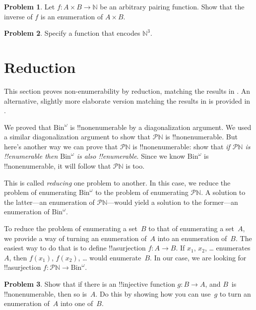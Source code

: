 \documentclass[10pt,a4paper]{article}
\makeatletter
\theoremstyle{plain}
\theoremstyle{definition}
\newtheorem{prob}{Problem}[section]
\theoremstyle{remark}
\newenvironment{editorial}{}{}
\newcommand*{\olfileid}[3]{}
\newcommand*{\olsection}[1]{\section*{#1}}
\newcommand{\olref}{\@ifnextchar[{\olref@i}{\olref@final}}
\def\olref@i[#1]{\@ifnextchar[{\olref@ii}{\olref@final}}
\def\olref@ii[#1]{\@ifnextchar[{\olref@iii}{\olref@final}}
\def\olref@iii[#1]{\olref@final}
\def\olref@final#1{\ref{#1}}
\providecommand{\Nat}{\ensuremath{\mathbb{N}}}
\providecommand{\Bin}{\mathrm{Bin}}
\providecommand{\Pow}{\mathcal{P}}
\makeatother
\begin{document}
\begin{prob}
Let $f \colon A \times B \to \Nat$ be an arbitrary pairing function.
Show that the inverse of $f$ is an enumeration of $A \times B$.
\end{prob}

\begin{prob}
Specify a function that encodes $\Nat^3$.
\end{prob}





\olfileid{sfr}{siz}{red-alt}

\olsection{Reduction}

\begin{editorial}
  This section proves non-enumerability by reduction, matching the
  results in \olref[nen-alt]{sec}. An alternative, slightly more
  elaborate version matching the results in \olref[nen]{sec} is
  provided in \olref[red]{sec}.
\end{editorial}

We proved that $\Bin^\omega$ is !!{nonenumerable} by a diagonalization
argument. We used a similar diagonalization argument to show that
$\Pow{\Nat}$ is !!{nonenumerable}. But here's another way we can prove
that $\Pow{\Nat}$ is !!{nonenumerable}: show that \emph{if
$\Pow{\Nat}$ is !!{enumerable} then $\Bin^\omega$ is also
!!{enumerable}}.  Since we know $\Bin^\omega$ is !!{nonenumerable}, it
will follow that $\Pow{\Nat}$ is too.  

This is called \emph{reducing} one problem to another. In this case,
we reduce the problem of enumerating $\Bin^\omega$ to the problem of
enumerating $\Pow{\Nat}$.  A solution to the latter---an enumeration
of $\Pow{\Nat}$---would yield a solution to the former---an
enumeration of $\Bin^\omega$.

To reduce the problem of enumerating a set~$B$ to that of enumerating
a set~$A$, we provide a way of turning an enumeration of~$A$ into an
enumeration of~$B$.  The easiest way to do that is to define
!!a{surjection} $f\colon A \to B$.  If $x_1$, $x_2$, \dots{}
enumerates~$A$, then $f(x_1)$, $f(x_2)$, \dots{} would enumerate~$B$.
In our case, we are looking for !!a{surjection} $f\colon \Pow{\Nat}
\to \Bin^\omega$.

\begin{prob}
Show that if there is an !!{injective} function $g\colon B \to A$, and
$B$~is !!{nonenumerable}, then so is~$A$. Do this by showing how you
can use~$g$ to turn an enumeration of~$A$ into one of~$B$.
\end{prob}
\end{document}

